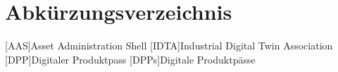 \section*{Abkürzungsverzeichnis}
\begin{singlespacing}
\end{singlespacing}
\begin{acronym}

[AAS]{Asset Administration Shell}
[IDTA]{Industrial Digital Twin Association}
[DPP]{Digitaler Produktpass}
[DPPs]{Digitale Produktpässe}

\end{acronym}



\newpage